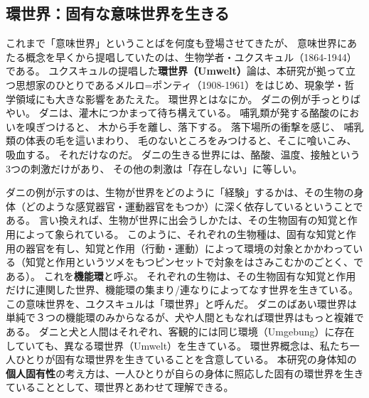 \subsection{環世界：固有な意味世界を生きる}
\label{subsec:umwelt}
これまで「意味世界」ということばを何度も登場させてきたが、
意味世界にあたる概念を早くから提唱していたのは、生物学者・ユクスキュル（1864-1944）である。
ユクスキュルの提唱した\textbf{環世界（Umwelt）}\cite{uexkull:1934}論は、本研究が拠って立つ思想家のひとりであるメルロ=ポンティ（1908-1961）をはじめ、現象学・哲学領域にも大きな影響をあたえた。
環世界とはなにか。
ダニの例が手っとりばやい。
ダニは、灌木につかまって待ち構えている。
哺乳類が発する酪酸のにおいを嗅ぎつけると、
木から手を離し、落下する。
落下場所の衝撃を感じ、
哺乳類の体表の毛を這いまわり、
毛のないところをみつけると、そこに喰いこみ、吸血する。
それだけなのだ。
ダニの生きる世界には、酪酸、温度、接触という3つの刺激だけがあり、
その他の刺激は「存在しない」に等しい。

ダニの例が示すのは、生物が世界をどのように「経験」するかは、その生物の身体（どのような感覚器官・運動器官をもつか）に深く依存しているということである。
言い換えれば、生物が世界に出会うしかたは、その生物固有の知覚と作用によって象られている。
このように、それぞれの生物種は、固有な知覚と作用の器官を有し、知覚と作用（行動・運動）によって環境の対象とかかわっている（知覚と作用というツメをもつピンセットで対象をはさみこむかのごとく、である）。
これを\textbf{機能環}と呼ぶ。
それぞれの生物は、その生物固有な知覚と作用だけに連関した世界、機能環の集まり/連なりによってなす世界を生きている。
この意味世界を、ユクスキュルは「環世界」と呼んだ。
ダニのばあい環世界は単純で３つの機能環のみからなるが、犬や人間ともなれば環世界はもっと複雑である。
ダニと犬と人間はそれぞれ、客観的には同じ環境（Umgebung）に存在していても、異なる環世界（Umwelt）を生きている。
環世界概念は、私たち一人ひとりが固有な環世界を生きていることを含意している。
本研究の身体知の\textbf{個人固有性}\cite{suwa:2016}の考え方は、一人ひとりが自らの身体に照応した固有の環世界を生きていることとして、環世界とあわせて理解できる。


